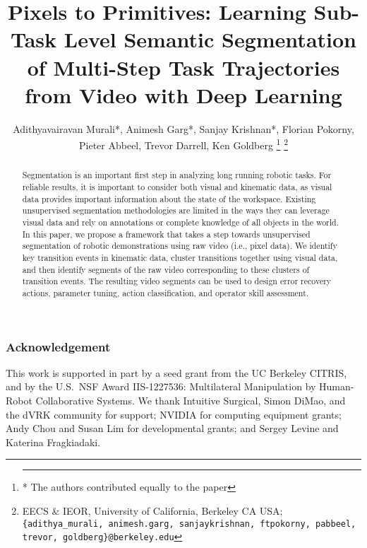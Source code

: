 \documentclass[letterpaper, 10 pt, conference]{ieeeconf}
\title{\LARGE \bf
Pixels to Primitives: Learning Sub-Task Level Semantic Segmentation \\
of Multi-Step Task Trajectories from Video with Deep Learning }
\author{%
Adithyavairavan Murali*, Animesh Garg*, Sanjay Krishnan*, Florian Pokorny,\\ 
Pieter Abbeel, Trevor Darrell, Ken Goldberg \quad {\textcolor{blue}{[v0.1, \today\,\currenttime]}}
\thanks{\hrule \vspace{5pt} * The authors contributed equally to the paper}%
\thanks{EECS \& IEOR, University of California, Berkeley CA USA; \texttt{\{adithya\_murali, animesh.garg, sanjaykrishnan, ftpokorny, pabbeel, trevor, goldberg\}@berkeley.edu}}%
}
\begin{document}
\maketitle

\begin{abstract}
Segmentation is an important first step in analyzing long running robotic tasks. For reliable results, it is important to consider both visual and kinematic data, as visual data provides important information about the state of the workspace. 
Existing unsupervised segmentation methodologies are limited in the ways they can leverage visual data and rely on annotations or complete knowledge of all objects in the world. In this paper, we propose a framework that takes a step towards unsupervised segmentation of robotic demonstrations using raw video (i.e., pixel data). 
We identify key transition events in kinematic data, cluster transitions together using visual data, and then identify segments of the raw video corresponding to these clusters of transition events. 
The resulting video segments can be used to design error recovery actions, parameter tuning, action classification, 
and operator skill assessment. 
\end{abstract} 










\subsubsection*{Acknowledgement}
This work is supported in part by a seed grant from the UC Berkeley CITRIS, and by the U.S.\ NSF Award IIS-1227536: Multilateral Manipulation by Human-Robot Collaborative Systems. We thank Intuitive Surgical, Simon DiMao, and the dVRK community for support; NVIDIA for computing equipment grants; Andy Chou and Susan Lim for developmental grants; and Sergey Levine and Katerina Fragkiadaki.



\end{document}
